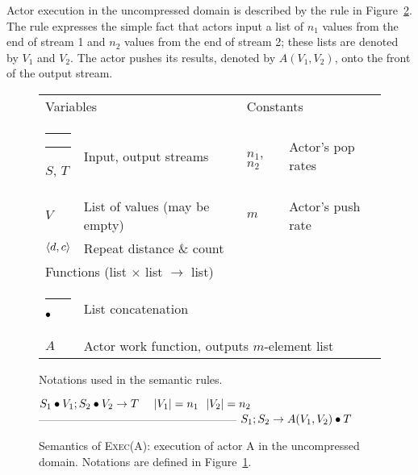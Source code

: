 Actor execution in the uncompressed domain is described by the rule in
Figure~\ref{fig:exec-rule}.  The rule expresses the simple fact that
actors input a list of $n_1$ values from the end of stream 1 and $n_2$
values from the end of stream 2; these lists are denoted by $V_1$ and
$V_2$.  The actor pushes its results, denoted by $A(V_1, V_2)$, onto
the front of the output stream.

\newcommand{\tablesep}{\hspace{-3.5pt}}
\begin{figure}[t]
\hspace{-5pt}\begin{tabular}{llll}
\multicolumn{2}{l}{Variables} & \multicolumn{2}{l}{{\tablesep}Constants} \\ \rule[10pt]{1.9in}{0.3pt}\hspace{0.1in}\rule[10pt]{1.3in}{0.3pt}\hspace{-1.3in}\hspace{-2pt}\hspace{-1.97in}\hspace{-2pt}
$S$, $T$ & {\tablesep}Input, output streams & {\tablesep}$n_1$, $n_2$ & {\tablesep}Actor's pop rates \\
$V$ & {\tablesep}List of values (may be empty) & {\tablesep}$m$ & {\tablesep}Actor's push rate \\
$\langle d, c\rangle$ & {\tablesep}Repeat distance \& count & {\tablesep}~ & ~ \vspace{6pt} \\
\multicolumn{2}{l}{Functions (list $\times$ list $\rightarrow$ list)}& ~ & ~ \\ \rule[10pt]{3.3in}{0.3pt}\hspace{-3.3in}
$\bullet$ & {\tablesep}List concatenation & ~ & ~ \\
$A$ & \multicolumn{3}{l}{{\tablesep}Actor work function, outputs $m$-element list}
\end{tabular}
\caption{Notations used in the semantic rules.\protect\label{fig:notations}}
\end{figure}

\begin{figure}[t]
$S_1 \bullet V_1; S_2 \bullet V_2 \rightarrow T~~~~|V_1|=n_1~~|V_2|=n_2$ \skiptop
----------------------------------------------------- \skipbot
$S_1; S_2 \rightarrow A(V_1, V_2) \bullet T$
\caption{Semantics of \textsc{Exec(A)}: execution of actor A in the
uncompressed domain.  Notations are defined in Figure~\ref{fig:notations}.
\protect\label{fig:exec-rule}}
\end{figure}

